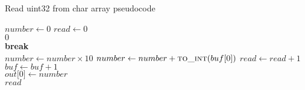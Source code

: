 \documentclass[12pt]{report}
\begin{document}
\begin{algorithm}
    \caption{Read uint32 from char array pseudocode}
    \label{code:read_uint32}
    \begin{algorithmic}[1]
            \State $number \gets 0$
            \State $read \gets 0$
            \\

                \State \Return $0$
            \EndIf\\

                    \State \textbf{break}
                \EndIf\\

                \State $number \gets number \times 10$
                \State $number \gets number + \Call {to\_int}{buf \lbrack 0 \rbrack}$
                \State $read \gets read + 1$
                \State $buf \gets buf + 1$
            \EndWhile\\

                \State $out \lbrack 0 \rbrack \gets number$
            \EndIf\\

            \State \Return $read$
        \EndFunction
    \end{algorithmic}
\end{algorithm}
\end{document}
